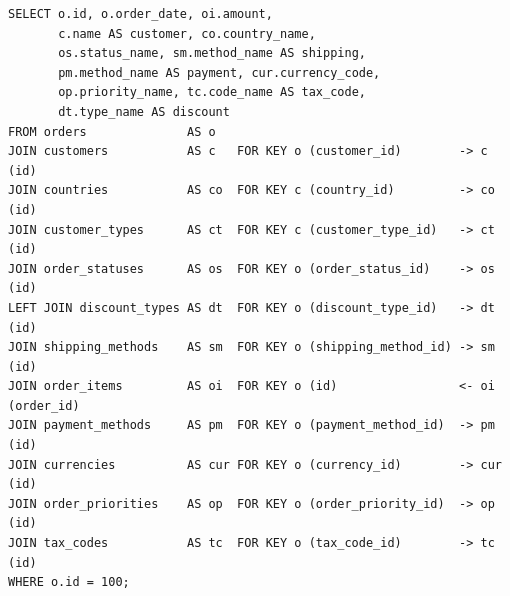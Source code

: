 \documentclass[12pt]{article}
\newcommand{\FanoutCheckHeight}[3]{%
  \ifdim\dimexpr\ht#1+\dp#1\relax>#2\relax
    \PackageError{fanout-layout}{#3 exceeds its vertical allocation}%
      {Adjust the terminal line spacing or the box position.}%
  \fi
}
\begin{document}
\newsavebox{\canonicalStageSix}
\begin{lrbox}{\canonicalStageSix}\begin{minipage}{344mm}
\begin{NoHyper}
\begin{lstlisting}[style=complex-sql]
SELECT o.id, o.order_date, oi.amount,
       c.name AS customer, co.country_name,
       os.status_name, sm.method_name AS shipping,
       pm.method_name AS payment, cur.currency_code,
       op.priority_name, tc.code_name AS tax_code,
       dt.type_name AS discount
FROM orders              AS o
JOIN customers           AS c   FOR KEY o (customer_id)        -> c (id)
JOIN countries           AS co  FOR KEY c (country_id)         -> co (id)
JOIN customer_types      AS ct  FOR KEY c (customer_type_id)   -> ct (id)
JOIN order_statuses      AS os  FOR KEY o (order_status_id)    -> os (id)
LEFT JOIN discount_types AS dt  FOR KEY o (discount_type_id)   -> dt (id)
JOIN shipping_methods    AS sm  FOR KEY o (shipping_method_id) -> sm (id)
JOIN order_items         AS oi  FOR KEY o (id)                 <- oi (order_id)
JOIN payment_methods     AS pm  FOR KEY o (payment_method_id)  -> pm (id)
JOIN currencies          AS cur FOR KEY o (currency_id)        -> cur (id)
JOIN order_priorities    AS op  FOR KEY o (order_priority_id)  -> op (id)
JOIN tax_codes           AS tc  FOR KEY o (tax_code_id)        -> tc (id)
WHERE o.id = 100;
\end{lstlisting}
\end{NoHyper}
\end{minipage}\end{lrbox}
\FanoutCheckHeight{\canonicalStageSix}{122mm}{Canonical-form state 6}
\end{document}
